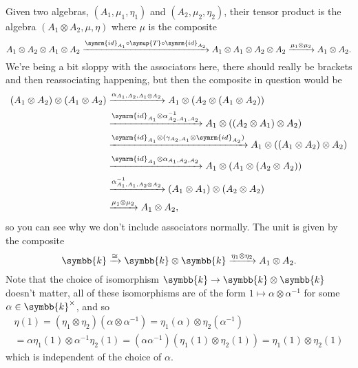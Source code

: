 \documentclass[fleqn]{NotesClass}
\newcommand{\switch}{\symup{T}}
\newcommand{\id}{\symrm{id}}
\newcommand{\isomorphic}{\cong}
\renewcommand{\field}{\symbb{k}}
\begin{document}
    Given two algebras, \((A_1, \mu_1, \eta_1)\) and \((A_2, \mu_2, \eta_2)\), their tensor product is the algebra \((A_1 \otimes A_2, \mu, \eta)\) where \(\mu\) is the composite
    \begin{equation}
        A_1 \otimes A_2 \otimes A_1 \otimes A_2 \xrightarrow{\id_{A_1} \circ \switch \circ \id_{A_2}} A_1 \otimes A_1 \otimes A_2 \otimes A_2 \xrightarrow{\mu_1 \otimes \mu_2} A_1 \otimes A_2.
    \end{equation}
    We're being a bit sloppy with the associators here, there should really be brackets and then reassociating happening, but then the composite in question would be
    \begin{align}
        (A_1 \otimes A_2) \otimes (A_1 \otimes A_2) &\xrightarrow{\alpha_{A_1,A_2,A_1\otimes A_2}} A_1 \otimes (A_2 \otimes (A_1 \otimes A_2))\\
        &\xrightarrow{\id_{A_1} \otimes \alpha^{-1}_{A_2,A_1,A_2}} A_1 \otimes ((A_2 \otimes A_1) \otimes A_2)\\
        &\xrightarrow{\id_{A_1} \otimes (\gamma_{A_2,A_1} \otimes \id_{A_2})} A_1 \otimes ((A_1 \otimes A_2) \otimes A_2)\\
        &\xrightarrow{\id_{A_1} \otimes \alpha_{A_1,A_2,A_2}} A_1 \otimes (A_1 \otimes (A_2 \otimes A_2))\\
        &\xrightarrow{\alpha^{-1}_{A_1,A_1,A_2\otimes A_2}} (A_1 \otimes A_1) \otimes (A_2 \otimes A_2)\\
        &\xrightarrow{\mu_1 \otimes \mu_2} A_1 \otimes A_2,
    \end{align}
    so you can see why we don't include associators normally.
    The unit is given by the composite
    \begin{equation}
        \field \xrightarrow{\isomorphic} \field \otimes \field \xrightarrow{\eta_1 \otimes \eta_2} A_1 \otimes A_2.
    \end{equation}
    Note that the choice of isomorphism \(\field \to \field \otimes \field\) doesn't matter, all of these isomorphisms are of the form \(1 \mapsto \alpha \otimes \alpha^{-1}\) for some \(\alpha \in \field^{\times}\), and so
    \begin{multline}
        \eta(1) = (\eta_1 \otimes \eta_2)(\alpha \otimes \alpha^{-1}) = \eta_1(\alpha) \otimes \eta_2(\alpha^{-1})\\
        = \alpha \eta_1(1) \otimes \alpha^{-1}\eta_2(1) = (\alpha \alpha^{-1}) (\eta_1(1) \otimes \eta_2(1)) = \eta_1(1) \otimes \eta_2(1)
    \end{multline}
    which is independent of the choice of \(\alpha\).
    
\end{document}
